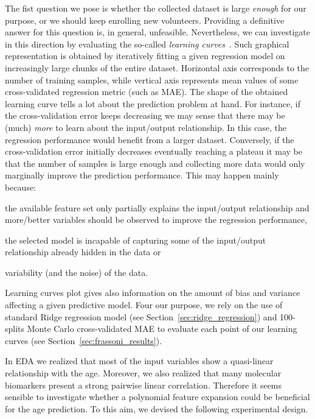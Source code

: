 The fist question we pose is whether the collected dataset is large \textit{enough} for our purpose, or we should keep enrolling new volunteers. Providing a definitive answer for this question is, in general, unfeasible. Nevertheless, we can investigate in this direction by evaluating the so-called \textit{learning curves}~\cite{murphy2012machine}. Such graphical representation is obtained by iteratively fitting a given regression model on increasingly large chunks of the entire dataset.
Horizontal axis corresponds to the number of training samples, while vertical axis represents mean values of some cross-validated regression metric (such as MAE).
The shape of the obtained learning curve tells a lot about the prediction problem at hand. For instance, if the cross-validation error keeps decreasing we may sense that there may be (much) \textit{more} to learn about the input/output relationship. In this case, the regression performance would benefit from a larger dataset. Conversely, if the cross-validation error initially decreases eventually reaching a plateau it may be that the number of samples is large enough and collecting more data would only marginally improve the prediction performance. This may happen mainly because:
\begin{enumerate*}[label=(\roman*)]
	\item the available feature set only partially explains the input/output relationship and more/better variables should be observed to improve the regression performance,
	\item the selected model is incapable of capturing some of the input/output relationship already hidden in the data or
	\item variability (and the noise) of the data.
\end{enumerate*}
Learning curves plot gives also information on the amount of bias and variance affecting a given predictive model.
Four our purpose, we rely on the use of standard Ridge regression model (see Section~\ref{sec:ridge_regression}) and 100-splits Monte Carlo cross-validated MAE to evaluate each point of our learning curves (see Section~\ref{sec:frassoni_results}).

In EDA we realized that most of the input variables show a quasi-linear relationship with the age. Moreover, we also realized that many molecular biomarkers present a strong pairwise linear correlation. Therefore it seems sensible to investigate whether a polynomial feature expansion could be beneficial for the age prediction.
To this aim, we devised the following experimental design.


